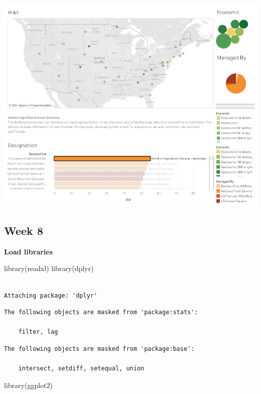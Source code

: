 \documentclass[
  letterpaper,
  DIV=11,
  numbers=noendperiod]{scrreprt}
\newenvironment{Shaded}{\begin{snugshade}}{\end{snugshade}}
\newcommand{\FunctionTok}[1]{\textcolor[rgb]{0.28,0.35,0.67}{#1}}
\newcommand{\NormalTok}[1]{\textcolor[rgb]{0.00,0.23,0.31}{#1}}
\begin{document}
\includegraphics{Dashboard2.png}

\subsection{Week 8}\label{week-8-2}

\textbf{Load libraries}

\begin{Shaded}
\begin{Highlighting}[]
\FunctionTok{library}\NormalTok{(readxl)}
\FunctionTok{library}\NormalTok{(dplyr)}
\end{Highlighting}
\end{Shaded}

\begin{verbatim}

Attaching package: 'dplyr'
\end{verbatim}

\begin{verbatim}
The following objects are masked from 'package:stats':

    filter, lag
\end{verbatim}

\begin{verbatim}
The following objects are masked from 'package:base':

    intersect, setdiff, setequal, union
\end{verbatim}

\begin{Shaded}
\begin{Highlighting}[]
\FunctionTok{library}\NormalTok{(ggplot2)}
\end{Highlighting}
\end{Shaded}
\end{document}
